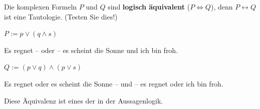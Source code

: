 

\begin{frame}

Die komplexen Formeln $P$ und $Q$ sind \textbf{logisch äquivalent} ($P \Leftrightarrow Q$), denn $P \leftrightarrow Q$ ist eine Tautologie. (Testen Sie dies!)

\begin{exe}
	
	 $P := p \lor (q \land s)$
	
	Es regnet -- oder -- es scheint die Sonne und ich bin froh.
	
	 $Q := (p \lor q) \land (p \lor s)$
	
	Es regnet oder es scheint die Sonne -- und -- es regnet oder ich bin froh.
\end{exe}

Diese Äquivalenz ist eines der  in der Aussagenlogik.

\end{frame}


